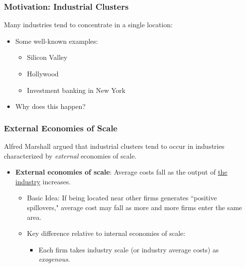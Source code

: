 \documentclass{beamer}
\begin{document}
\begin{frame}
	\frametitle{Motivation: Industrial Clusters}
Many industries tend to concentrate in a single location:
\begin{itemize}
	\item Some well-known examples:
	\begin{itemize}
		\item Silicon Valley
		\item Hollywood
		\item Investment banking in New York
	\end{itemize}
	\item Why does this happen?
\end{itemize}
\end{frame}

\begin{frame}
	\frametitle{External Economies of Scale}
	Alfred Marshall argued that industrial clusters tend to occur in industries characterized by \emph{external} economies of scale.
	\begin{itemize}
		\item \textbf{External economies of scale}: Average costs fall as the output of \underline{the industry} increases.
			\begin{itemize}
				\item Basic Idea: If being located near other firms generates ``positive spillovers," average cost may fall as more and more firms enter the same area.
				\item Key difference relative to internal economies of scale:
					\begin{itemize}
						\item Each firm takes industry scale (or industry average costs) as \emph{exogenous}.
					\end{itemize}
			\end{itemize}
	\end{itemize}
	
\end{frame}
\end{document}
